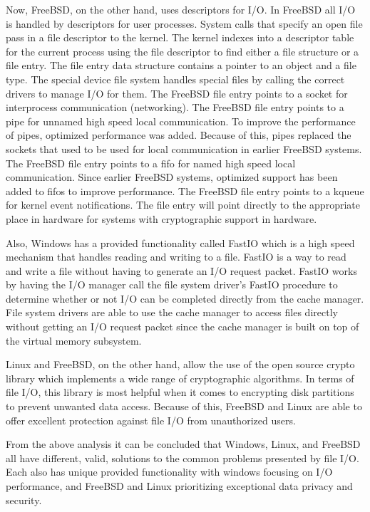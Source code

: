 \documentclass[letterpaper,10pt,draftclsnofoot,onecolumn,]{IEEEtran}
\begin{document}
Now, FreeBSD, on the other hand, uses descriptors for I/O. In FreeBSD all I/O is handled by descriptors for user processes. System calls that specify an open file pass in a file descriptor to the kernel. The kernel indexes into a descriptor table for the current process using the file descriptor to find either a file structure or a file entry. The file entry data structure contains a pointer to an object and a file type. The special device file system handles special files by calling the correct drivers to manage I/O for them. The FreeBSD file entry points to a socket for interprocess communication (networking). The FreeBSD file entry points to a pipe for unnamed high speed local communication. To improve the performance of pipes, optimized performance was added. Because of this, pipes replaced the sockets that used to be used for local communication in earlier FreeBSD systems. The FreeBSD file entry points to a fifo for named high speed local communication. Since earlier FreeBSD systems, optimized support has been added to fifos to improve performance. The FreeBSD file entry points to a kqueue for kernel event notifications. The file entry will point directly to the appropriate place in hardware for systems with cryptographic support in hardware.

Also, Windows has a provided functionality called FastIO which is a high speed mechanism that handles reading and writing to a file. FastIO is a way to read and write a file without having to generate an I/O request packet. FastIO works by having the I/O manager call the file system driver's FastIO procedure to determine whether or not I/O can be completed directly from the cache manager. File system drivers are able to use the cache manager to access files directly without getting an I/O request packet since the cache manager is built on top of the virtual memory subsystem. 

Linux and FreeBSD, on the other hand, allow the use of the open source crypto library which implements a wide range of cryptographic algorithms. In terms of file I/O, this library is most helpful when it comes to encrypting disk partitions to prevent unwanted data access. Because of this, FreeBSD and Linux are able to offer excellent protection against file I/O from unauthorized users.

From the above analysis it can be concluded that Windows, Linux, and FreeBSD all have different, valid, solutions to the common problems presented by file I/O. Each also has unique provided functionality with windows focusing on I/O performance, and FreeBSD and Linux prioritizing exceptional data privacy and security.
\end{document}
